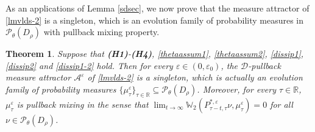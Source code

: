 \documentclass[11pt]{article}
\numberwithin{equation}{section}
\theoremstyle{plain}
\newtheorem{theorem}{Theorem}[section]
\begin{document}
As
an applications of Lemma \ref{sdsec}, 
we now 
prove that the  measure attractor of \eqref{lmvlds-2}
is a singleton, 
which is an evolution family of 
probability measures in $\mathcal{P}_{\theta}(D_\rho)$ with pullback mixing property.

\begin{theorem}\label{sin-attractor}
   Suppose that {\bf(H1)}-{\bf(H4)}, \eqref{thetaassum1}, \eqref{thetaassum2}, \eqref{dissip1}, \eqref{dissip2} 
   and \eqref{dissip1-2} hold.
   Then for every $\varepsilon \in (0, \varepsilon_0)$,
   the 
   $\mathcal{D}$-pullback measure attractor $\mathcal{A}^\varepsilon$ of \eqref{lmvlds-2} 
   is a singleton, 
   which is actually an evolution family of 
   probability measures $\{ \mu_\tau^\varepsilon \}_{\tau \in \mathbb{R} }  \subseteq \mathcal{P}_{\theta}(D_\rho)$.
   Moreover, for 
   every  $\tau \in \mathbb{R}$, $\mu_\tau^\varepsilon$ is pullback mixing in the sense that
   $ \lim_{t \to \infty}
          \mathbb{W}_2
                     \left( P_{\tau-t, \tau}^{\ast,\varepsilon} \nu,
                              \mu_\tau^\varepsilon
                     \right)
      = 0 $
   for all $\nu \in \mathcal{P}_{\theta}(D_\rho)$.
\end{theorem}
\end{document}

